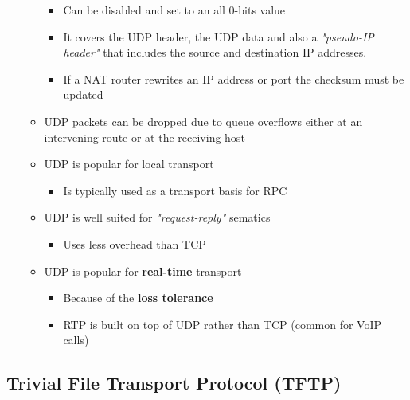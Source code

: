 \documentclass[11pt]{article}
\providecommand{\tightlist}{%
      \setlength{\itemsep}{0pt}\setlength{\parskip}{0pt}}
\begin{document}
\begin{itemize}
\begin{itemize}
    \begin{itemize}
    \tightlist
    \item
      Can be disabled and set to an all 0-bits value
    \item
      It covers the UDP header, the UDP data and also a \emph{"pseudo-IP
      header"} that includes the source and destination IP addresses.
    \item
      If a NAT router rewrites an IP address or port the checksum must
      be updated
    \end{itemize}
  \item
    UDP packets can be dropped due to queue overflows either at an
    intervening route or at the receiving host
  \item
    UDP is popular for local transport

    \begin{itemize}
    \tightlist
    \item
      Is typically used as a transport basis for RPC
    \end{itemize}
  \item
    UDP is well suited for \emph{"request-reply"} sematics

    \begin{itemize}
    \tightlist
    \item
      Uses less overhead than TCP
    \end{itemize}
  \item
    UDP is popular for \textbf{real-time} transport

    \begin{itemize}
    \tightlist
    \item
      Because of the \textbf{loss tolerance}
    \item
      RTP is built on top of UDP rather than TCP (common for VoIP calls)
    \end{itemize}
  \end{itemize}
\end{itemize}

    \subsection{Trivial File Transport Protocol
(TFTP)}\label{trivial-file-transport-protocol-tftp}
\end{document}
